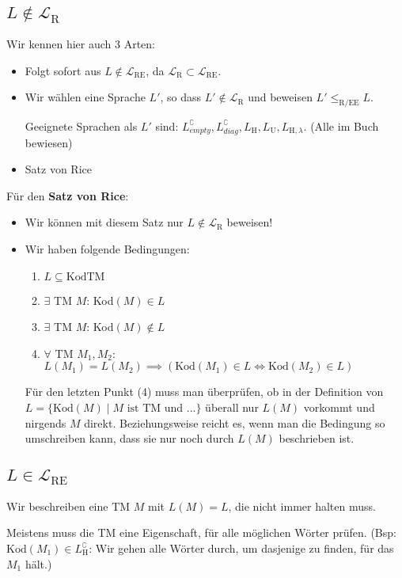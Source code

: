 \documentclass[a4paper, 11pt]{article}
\def\L{\mathcal{L}}
\begin{document}
    \subsection{$L \notin \L_{\text{R}}$}
    Wir kennen hier auch 3 Arten:
    \begin{itemize}
        \item Folgt sofort aus $L \notin \L_{\text{RE}}$, da $\L_{\text{R}} \subset \L_{\text{RE}}$.
        \item Wir wählen eine Sprache $L'$, so dass $L' \notin \L_{\text{R}}$ und beweisen $L' \leq_{\text{R/EE}} L$.
        
            Geeignete Sprachen als $L'$ sind: $L_{empty}^\complement, L_{diag}^\complement, L_\text{H}, L_\text{U}, L_{\text{H}, \lambda}$. (Alle im Buch bewiesen)
        \item Satz von Rice 
    \end{itemize}

    Für den \textbf{Satz von Rice}:
    \begin{itemize}
        \item Wir können mit diesem Satz nur $L \notin \L_{\text{R}}$ beweisen!
        \item Wir haben folgende Bedingungen:
        \begin{enumerate}
            \item $L \subseteq \text{KodTM}$
            \item $\exists$ TM $M$: Kod$(M) \in L$
            \item $\exists$ TM $M$: Kod$(M) \notin L$
            \item $\forall$ TM $M_1, M_2$: $L(M_1) = L(M_2) \implies \left(\text{Kod}(M_1) \in L \iff \text{Kod}(M_2) \in L\right)$
        \end{enumerate}
        Für den letzten Punkt (4) muss man überprüfen, ob in der Definition von $L = \{\text{Kod}(M) \mid M \text{ ist TM und ...}\}$ überall nur $L(M)$ vorkommt und nirgends $M$ direkt. Beziehungsweise reicht es, wenn man die Bedingung so umschreiben kann, dass sie nur noch durch $L(M)$ beschrieben ist.
    \end{itemize}
    
    
    \subsection{$L \in \L_{\text{RE}}$}
    Wir beschreiben eine TM $M$ mit $L(M) = L$, die nicht immer halten muss. 
    
    Meistens muss die TM eine Eigenschaft, für alle möglichen Wörter prüfen. (Bsp: $\text{Kod}(M_1) \in L_\text{H}^\complement$: Wir gehen alle Wörter durch, um dasjenige zu finden, für das $M_1$ hält.)
    
\end{document}
